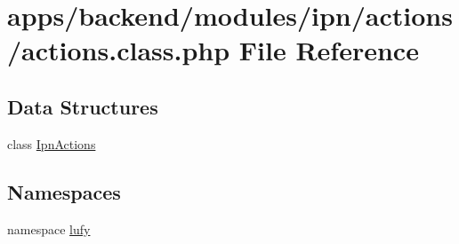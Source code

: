 \hypertarget{backend_2modules_2ipn_2actions_2actions_8class_8php}{\section{apps/backend/modules/ipn/actions/actions.class.\-php File Reference}
\label{backend_2modules_2ipn_2actions_2actions_8class_8php}
}
\subsection*{Data Structures}
\begin{DoxyCompactItemize}
\item 
class \hyperlink{class_ipn_actions}{Ipn\-Actions}
\end{DoxyCompactItemize}
\subsection*{Namespaces}
\begin{DoxyCompactItemize}
\item 
namespace \hyperlink{namespacelufy}{lufy}
\end{DoxyCompactItemize}
